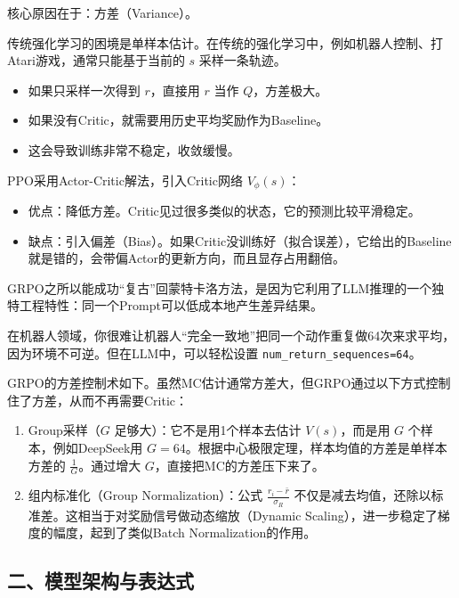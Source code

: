 核心原因在于：方差（Variance）。

传统强化学习的困境是单样本估计。在传统的强化学习中，例如机器人控制、打Atari游戏，通常只能基于当前的 \(s\) 采样一条轨迹。

\begin{itemize}
\tightlist
\item
  如果只采样一次得到 \(r\)，直接用 \(r\) 当作 \(Q\)，方差极大。
\item
  如果没有Critic，就需要用历史平均奖励作为Baseline。
\item
  这会导致训练非常不稳定，收敛缓慢。
\end{itemize}

PPO采用Actor-Critic解法，引入Critic网络 \(V_{\phi}(s)\)：

\begin{itemize}
\tightlist
\item
  优点：降低方差。Critic见过很多类似的状态，它的预测比较平滑稳定。
\item
  缺点：引入偏差（Bias）。如果Critic没训练好（拟合误差），它给出的Baseline就是错的，会带偏Actor的更新方向，而且显存占用翻倍。
\end{itemize}

GRPO之所以能成功``复古''回蒙特卡洛方法，是因为它利用了LLM推理的一个独特工程特性：同一个Prompt可以低成本地产生差异结果。

在机器人领域，你很难让机器人``完全一致地''把同一个动作重复做64次来求平均，因为环境不可逆。但在LLM中，可以轻松设置 \texttt{num\_return\_sequences=64}。

GRPO的方差控制术如下。虽然MC估计通常方差大，但GRPO通过以下方式控制住了方差，从而不再需要Critic：

\begin{enumerate}
\def\labelenumi{\arabic{enumi}.}
\tightlist
\item
  Group采样（\(G\) 足够大）：它不是用1个样本去估计 \(V(s)\)，而是用 \(G\) 个样本，例如DeepSeek用 \(G=64\)。根据中心极限定理，样本均值的方差是单样本方差的 \(\frac{1}{G}\)。通过增大 \(G\)，直接把MC的方差压下来了。
\item
  组内标准化（Group Normalization）：公式 \(\frac{r_i-\bar{r}}{\sigma_R}\) 不仅是减去均值，还除以标准差。这相当于对奖励信号做动态缩放（Dynamic Scaling），进一步稳定了梯度的幅度，起到了类似Batch Normalization的作用。
\end{enumerate}

\hypertarget{ux4e8cux6a21ux578bux67b6ux6784ux4e0eux8868ux8fbeux5f0f}{%
\subsection{二、模型架构与表达式}\label{ux4e8cux6a21ux578bux67b6ux6784ux4e0eux8868ux8fbeux5f0f}}

